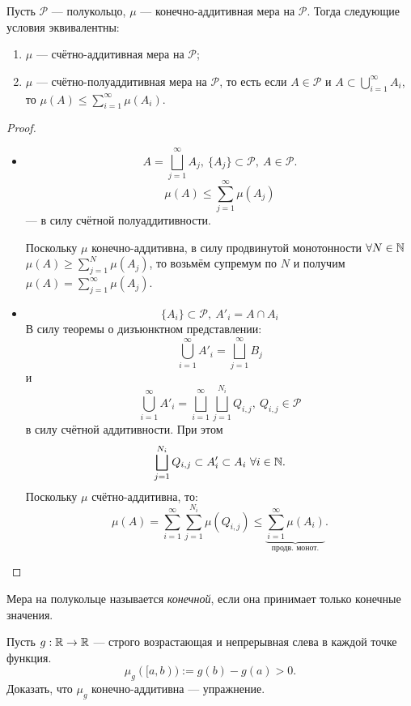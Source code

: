 \begin{theorem}
    Пусть $\mathcal{P}$ — полукольцо, $\mu$ — конечно-аддитивная мера на $\mathcal{P}$. Тогда следующие условия эквивалентны:
    \begin{enumerate}
        \item $\mu$ — счётно-аддитивная мера на $\mathcal{P}$;
        \item $\mu$ — счётно-полуаддитивная мера на $\mathcal{P}$, то есть если $A \in \mathcal{P}$ и $A \subset \bigcup\limits_{i=1}^{\infty} A_i$, то $\mu(A) \leqslant \sum\limits_{i=1}^{\infty}\mu(A_i)$.
    \end{enumerate}
\end{theorem} 
\begin{proof}\tab
    \begin{itemize}
        \item[$\underline{2 \Longrightarrow 1}$]
    \[A = \bigsqcup\limits_{j=1}^{\infty} A_j, \ \{A_j\} \subset \mathcal{P}, \ A \in \mathcal{P}.\]
    \[\mu(A) \leqslant \sum\limits_{j=1}^{\infty}\mu(A_j)\]
    — в силу счётной полуаддитивности.

    \noindent Поскольку $\mu$ конечно-аддитивна, в силу продвинутой монотонности $\forall N \in \mathbb{N}$ $\mu(A) \geqslant \sum\limits_{j=1}^{N}\mu(A_j)$, то возьмём супремум по $N$ и получим $\mu(A) = \sum\limits_{j=1}^{\infty} \mu(A_j)$.
        \item[$\underline{1 \Longrightarrow 2}$]
    \[\{A_i\} \subset \mathcal{P}, \ A'_i = A \cap A_i\]
    В силу теоремы о дизъюнктном представлении:
    \[\bigcup\limits_{i=1}^{\infty} A'_i = \bigsqcup\limits_{j=1}^{\infty} B_j\]
    и 
    \[\bigcup\limits_{i=1}^{\infty} A'_i = \bigsqcup\limits_{i=1}^{\infty} \bigsqcup\limits_{j=1}^{N_i} Q_{i,j}, \ Q_{i,j} \in \mathcal{P}\]
    в силу счётной аддитивности.
    При этом
    \[\bigsqcup\limits_{j=1}^{N_i} Q_{i,j} \subset A'_i \subset A_i \ \forall i \in \mathbb{N}.\]
    Поскольку $\mu$ счётно-аддитивна, то:
    \[\mu(A) = \sum\limits_{i=1}^{\infty} \sum\limits_{j=1}^{N_i} \mu(Q_{i,j}) \leqslant \underbrace{\sum\limits_{i=1}^{\infty} \mu(A_i)}_{\text{продв. монот.}}.\]
    \end{itemize}
\end{proof} 

\begin{remark}
    Мера на полукольце называется \textit{конечной}, если она принимает только конечные значения.
\end{remark}

Пусть $g: \mathbb{R} \to \mathbb{R}$ — строго возрастающая и непрерывная слева в каждой точке функция.
\[\mu_g([a,b)) := g(b) - g(a) > 0.\]
Доказать, что $\mu_g$ конечно-аддитивна — упражнение.


